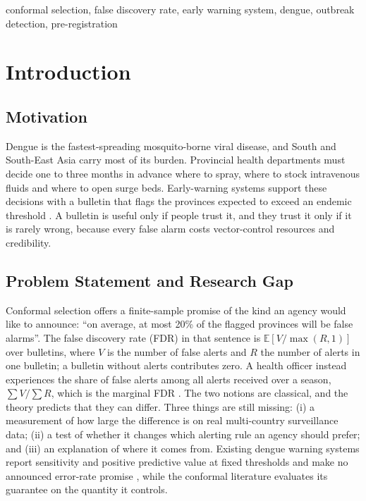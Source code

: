 \documentclass[conference]{IEEEtran}
\begin{document}
\begin{IEEEkeywords}
conformal selection, false discovery rate, early warning system, dengue, outbreak detection, pre-registration
\end{IEEEkeywords}

\section{Introduction}

\subsection{Motivation}
Dengue is the fastest-spreading mosquito-borne viral disease, and South and South-East Asia carry most of its burden. Provincial health departments must decide one to three months in advance where to spray, where to stock intravenous fluids and where to open surge beds. Early-warning systems support these decisions with a bulletin that flags the provinces expected to exceed an endemic threshold \cite{bortman1999,hussain2018ewars,lowe2016}. A bulletin is useful only if people trust it, and they trust it only if it is rarely wrong, because every false alarm costs vector-control resources and credibility.

\subsection{Problem Statement and Research Gap}
Conformal selection \cite{jin2023selection} offers a finite-sample promise of the kind an agency would like to announce: ``on average, at most 20\% of the flagged provinces will be false alarms''. The false discovery rate (FDR) in that sentence is $\mathbb{E}[V/\max(R,1)]$ over bulletins, where $V$ is the number of false alerts and $R$ the number of alerts in one bulletin; a bulletin without alerts contributes zero. A health officer instead experiences the share of false alerts among all alerts received over a season, $\sum V/\sum R$, which is the marginal FDR \cite{genovese2002,sun2007}. The two notions are classical, and the theory predicts that they can differ. Three things are still missing: (i) a measurement of how large the difference is on real multi-country surveillance data; (ii) a test of whether it changes which alerting rule an agency should prefer; and (iii) an explanation of where it comes from. Existing dengue warning systems report sensitivity and positive predictive value at fixed thresholds and make no announced error-rate promise \cite{lowe2016,hussain2018ewars}, while the conformal literature evaluates its guarantee on the quantity it controls.
\end{document}
